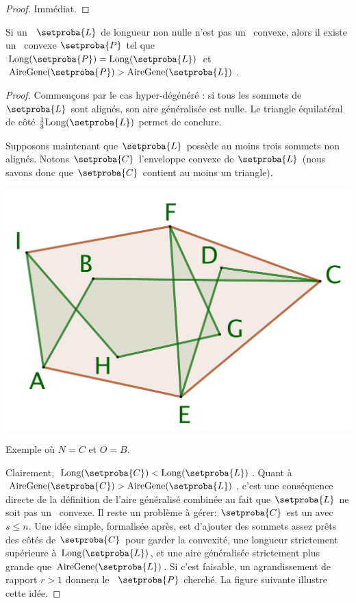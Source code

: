 \begin{proof}
	Immédiat.
\end{proof}




\begin{fact} \label{max-is-nconv}
    Si un \ncycle\ $\setproba{L}$ de longueur non nulle n'est pas un \ngone\ convexe, alors il existe un \ngone\ convexe $\setproba{P}$ tel que
	$\perim{\setproba{P}} = \perim{\setproba{L}}$
	et
	$\garea{\setproba{P}} > \garea{\setproba{L}}$.
\end{fact}


\begin{proof}
	Commençons par le cas \og hyper-dégénéré \fg: si tous les sommets de $\setproba{L}$ sont alignés, son aire généralisée est nulle. Le triangle équilatéral de côté $\frac13 \perim{\setproba{L}}$ permet de conclure.
	
	Supposons maintenant que $\setproba{L}$ possède au moins trois sommets non alignés.
	Notons $\setproba{C}$ l'enveloppe convexe de $\setproba{L}$ (nous savons donc que $\setproba{C}$ contient au moins un triangle).
	
	\begin{center}
		\centering
		\small\itshape
		\includegraphics[scale=.45]{content/polygon/at-least-one/convex-hull.png}
		
		\smallskip
		Exemple où $N = C$ et $O = B$.
	\end{center}
	
		
	Clairement, $\perim{\setproba{C}} < \perim{\setproba{L}}$.
	Quant à $\garea{\setproba{C}} > \garea{\setproba{L}}$, c'est une conséquence directe de la définition de l'aire généralisé combinée au fait que $\setproba{L}$ ne soit pas un \ngone\ convexe.
	Il reste un problème à gérer: $\setproba{C}$ est un  avec $s \leq n$. 
	Une idée simple, formalisée après, est d'ajouter des sommets assez prêts des côtés de $\setproba{C}$ pour garder la convexité, une longueur strictement supérieure à $\perim{\setproba{L}}$, et une aire généralisée strictement plus grande que $\garea{\setproba{L}}$. Si c'est faisable, un agrandissement de rapport $r > 1$ donnera le \ngone\ $\setproba{P}$ cherché.
	La figure suivante illustre cette idée.


\end{proof}
